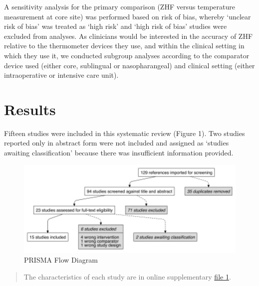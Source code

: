 \documentclass[smallextended]{svjour3}       %
\begin{document}
A sensitivity analysis for the primary comparison (ZHF versus
temperature measurement at core site) was performed based on risk of
bias, whereby `unclear risk of bias' was treated as `high risk' and
`high risk of bias' studies were excluded from analyses. As clinicians
would be interested in the accuracy of ZHF relative to the thermometer
devices they use, and within the clinical setting in which they use it,
we conducted subgroup analyses according to the comparator device used
(either core, sublingual or nasopharangeal) and clinical setting (either
intraoperative or intensive care unit).

\hypertarget{results}{%
\section{Results}\label{results}}

Fifteen studies were included in this systematic review (Figure 1). Two
studies reported only in abstract form were not included and assigned as
`studies awaiting classification' because there was insufficient
information provided.

\begin{figure}

{\centering \includegraphics[width=4.86in]{zhf_manuscript_files/figure-latex/fig-1-1} 

}

\caption{PRISMA Flow Diagram}\label{fig:fig-1}
\end{figure}

\begin{quote}
The characteristics of each study are in online supplementary
\href{link\%20to\%20file\%201}{file 1}.
\end{quote}
\end{document}
